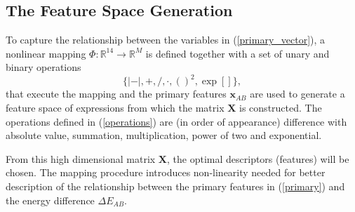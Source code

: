 \documentclass[11pt,oneside,czech,american]{book} %
\theoremstyle{plain}
\theoremstyle{definition}
\renewcommand{\vec}[1]{\boldsymbol{#1}}
\begin{document}
\subsection{The Feature Space Generation}
To capture the relationship between the variables in (\ref{primary_vector}), a nonlinear mapping $\Phi: \mathbb{R}^{14} \rightarrow \mathbb{R}^{M}$ is defined together with a set of unary and binary operations
\begin{equation}
	\big\{|-|, +, /, \cdot, ()^2, \exp[]\big\},
	\label{operations}
\end{equation}
  that execute the mapping and the primary features $\textbf{x}_{AB}$ are used to generate a feature space of expressions from which the matrix $\vec{X}$ is constructed. The operations defined in (\ref{operations}) are (in order of appearance) difference with absolute value, summation, multiplication, power of two and exponential.
  
   From this high dimensional matrix $\bm{X}$, the optimal descriptors (features) will be chosen. The mapping procedure introduces non-linearity needed for better description of the relationship between the primary features in (\ref{primary}) and the energy difference $\Delta E_{AB}$.%
\end{document}
